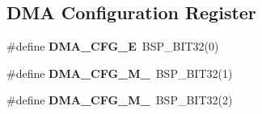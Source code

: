 \subsection*{D\+MA Configuration Register}
\begin{DoxyCompactItemize}
\item 
\mbox{\label{group__lpc__dma_ga8e03b25547e14ac2264b8daa8227bc80}} 
\#define {\bfseries D\+M\+A\+\_\+\+C\+F\+G\+\_\+E}~B\+S\+P\+\_\+\+B\+I\+T32(0)
\item 
\mbox{\label{group__lpc__dma_gae441cf31a84d22ddeafcebb7895f8c45}} 
\#define {\bfseries D\+M\+A\+\_\+\+C\+F\+G\+\_\+\+M\+\_}~B\+S\+P\+\_\+\+B\+I\+T32(1)
\item 
\mbox{\label{group__lpc__dma_ga4a014397a904a4dcc457e855a7c42bcc}} 
\#define {\bfseries D\+M\+A\+\_\+\+C\+F\+G\+\_\+\+M\+\_}~B\+S\+P\+\_\+\+B\+I\+T32(2)
\end{DoxyCompactItemize}
